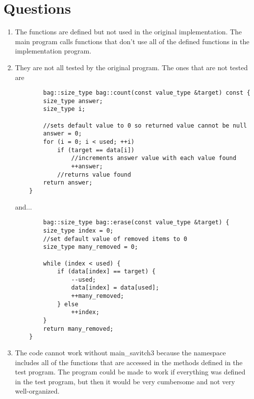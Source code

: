 \documentclass[11pt]{article}
\begin{document}
\section{Questions}
\begin{enumerate}
    \item The functions are defined but not used in the original implementation. The main program calls functions that don't use all of the defined functions in the implementation program. 
    
    \item They are not all tested by the original program. The ones that are not tested are 
    \begin{lstlisting}
        bag::size_type bag::count(const value_type &target) const {
        size_type answer;
        size_type i;

        //sets default value to 0 so returned value cannot be null
        answer = 0;
        for (i = 0; i < used; ++i)
            if (target == data[i])
                //increments answer value with each value found
                ++answer;
            //returns value found
        return answer;
    }
    \end{lstlisting}
and...
    \begin{lstlisting}
        bag::size_type bag::erase(const value_type &target) {
        size_type index = 0;
        //set default value of removed items to 0
        size_type many_removed = 0;

        while (index < used) {
            if (data[index] == target) {
                --used;
                data[index] = data[used];
                ++many_removed;
            } else
                ++index;
        }
        return many_removed;
    }
    \end{lstlisting}
    
    \item The code cannot work without main\_savitch3 because the namespace includes all of the functions that are accessed in the methods defined in the test program. The program could be made to work if everything was defined in the test program, but then it would be very cumbersome and not very well-organized.
\end{enumerate}
\end{document}
